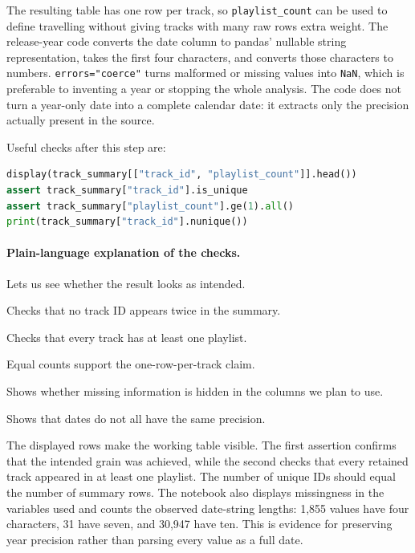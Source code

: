 \documentclass[11pt,a4paper]{article}
\begin{document}
The resulting table has one row per track, so \texttt{playlist\_count} can be used to define travelling without giving tracks with many raw rows extra weight. The release-year code converts the date column to pandas' nullable string representation, takes the first four characters, and converts those characters to numbers. \texttt{errors="coerce"} turns malformed or missing values into \texttt{NaN}, which is preferable to inventing a year or stopping the whole analysis. The code does not turn a year-only date into a complete calendar date: it extracts only the precision actually present in the source.

Useful checks after this step are:

\begin{lstlisting}[language=python]
display(track_summary[["track_id", "playlist_count"]].head())
assert track_summary["track_id"].is_unique
assert track_summary["playlist_count"].ge(1).all()
print(track_summary["track_id"].nunique())
\end{lstlisting}

\paragraph{Plain-language explanation of the checks.}
\begin{description}[leftmargin=3.2cm,style=multiline]
    \item[Show a few rows] Lets us see whether the result looks as intended.
    \item[Check unique IDs] Checks that no track ID appears twice in the summary.
    \item[Check playlist counts] Checks that every track has at least one playlist.
    \item[Count rows twice] Equal counts support the one-row-per-track claim.
    \item[Count empty values] Shows whether missing information is hidden in the columns we plan to use.
    \item[Count date lengths] Shows that dates do not all have the same precision.
\end{description}

The displayed rows make the working table visible. The first assertion confirms that the intended grain was achieved, while the second checks that every retained track appeared in at least one playlist. The number of unique IDs should equal the number of summary rows. The notebook also displays missingness in the variables used and counts the observed date-string lengths: 1,855 values have four characters, 31 have seven, and 30,947 have ten. This is evidence for preserving year precision rather than parsing every value as a full date.
\end{document}
